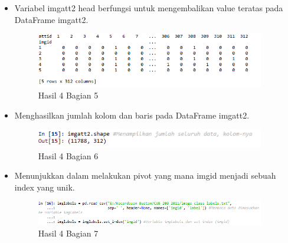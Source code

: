 \begin{itemize}
\item Variabel imgatt2 head berfungsi untuk mengembalikan value teratas pada DataFrame imgatt2.

\begin{figure}[H]
\centerline{\includegraphics[width=10cm]{figures/1174087/3/12.png}}
\caption{Hasil 4 Bagian 5}
\label{labelgambar}
\end{figure}

\item Menghasilkan jumlah kolom dan baris pada DataFrame imgatt2.

\begin{figure}[H]
\centerline{\includegraphics[width=10cm]{figures/1174087/3/13.png}}
\caption{Hasil 4 Bagian 6}
\label{labelgambar}
\end{figure}

\item Menunjukkan dalam melakukan pivot yang mana imgid menjadi sebuah index yang unik.

\begin{figure}[H]
\centerline{\includegraphics[width=10cm]{figures/1174087/3/14.png}}
\caption{Hasil 4 Bagian 7}
\label{labelgambar}
\end{figure}


\end{itemize}
